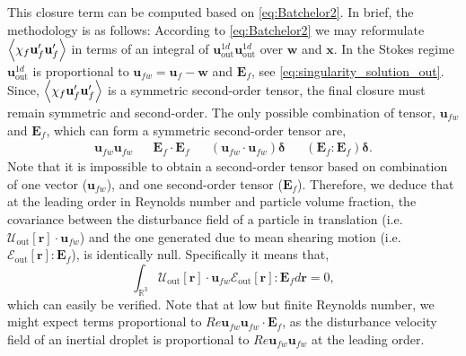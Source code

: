 This closure term can be computed based on \ref{eq:Batchelor2}. 
In brief, the methodology is as follows:
According to \ref{eq:Batchelor2} we may reformulate $\left<\chi_f \textbf{u}_f'\textbf{u}_f'\right>$ in terms of an integral of $\textbf{u}_\text{out}^{1d}\textbf{u}_\text{out}^{1d}$ over $\textbf{w}$ and $\textbf{x}$. 
In the Stokes regime $\textbf{u}_\text{out}^{1d}$ is proportional to $\textbf{u}_{fw} = \textbf{u}_f - \textbf{w}$ and $\textbf{E}_f$, see \ref{eq:singularity_solution_out}. 
Since, $\left<\chi_f \textbf{u}_f'\textbf{u}_f'\right>$ is a symmetric second-order tensor, the final closure must remain symmetric and second-order.
The only possible combination of tensor, $\textbf{u}_{fw}$ and $\textbf{E}_f$, which can form a symmetric second-order tensor are, 
\begin{align}
    \textbf{u}_{fw}
    \textbf{u}_{fw}
    &&
    \textbf{E}_f\cdot \textbf{E}_f
    && 
    (\textbf{u}_{fw}\cdot 
    \textbf{u}_{fw})\bm\delta
    &&
    (\textbf{E}_f : \textbf{E}_f)\bm\delta. 
\end{align}
Note that it is impossible to obtain a second-order tensor based on combination of one vector ($\textbf{u}_{fw}$), and one second-order tensor ($\textbf{E}_f$). 
Therefore, we deduce that at the leading order in Reynolds number and particle volume fraction, the covariance between the disturbance field of a particle in translation (i.e. $\mathcal{U}_\text{out}[\textbf{r}] \cdot \textbf{u}_{fw}$) and the one generated due to mean shearing motion (i.e. $\mathcal{E}_\text{out}[\textbf{r}]: \textbf{E}_{f}$), is identically null. 
Specifically it means that,
\begin{equation}
    \int_{\mathbb{R}^3} \mathcal{U}_\text{out}[\textbf{r}] \cdot \textbf{u}_{fw}
     \mathcal{E}_\text{out}[\textbf{r}]: \textbf{E}_{f} d\textbf{r} = 0,
\end{equation}
which can easily be verified. 
Note that at low but finite Reynolds number, we might expect terms proportional to $Re \textbf{u}_{fw}\textbf{u}_{fw} \cdot \textbf{E}_f$, as the disturbance velocity field of an inertial droplet is proportional to $Re \textbf{u}_{fw}\textbf{u}_{fw}$ at the leading order. 

